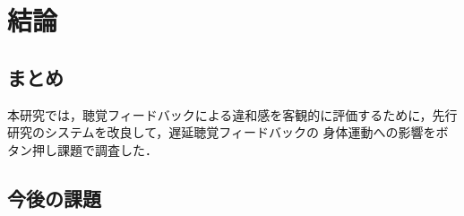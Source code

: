 \chapter{結論}
\section{まとめ}
本研究では，聴覚フィードバックによる違和感を客観的に評価するために，先行研究のシステムを改良して，遅延聴覚フィードバックの
身体運動への影響をボタン押し課題で調査した．
\section{今後の課題}
